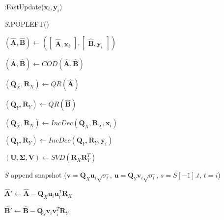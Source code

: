 \begin{algorithm}[t]
    \caption{\oursolution:FastUpdate($\boldsymbol{x}_i,\boldsymbol{y}_i$)}
    \label{alg:fast-update}
    \DontPrintSemicolon
    
    {
        $S$.POPLEFT()
    }
    
    $(\hat{\boldsymbol{A}},\hat{\boldsymbol{B}})\leftarrow (\begin{bmatrix} \hat{\boldsymbol{A}} , \boldsymbol{x}_i \end{bmatrix}, \begin{bmatrix} \hat{\boldsymbol{B}} , \boldsymbol{y}_i \end{bmatrix})$

    {
        $(\hat{\boldsymbol{A}},\hat{\boldsymbol{B}}) \leftarrow COD(\hat{\boldsymbol{A}},\hat{\boldsymbol{B}})$

        $(\boldsymbol{Q}_X,\boldsymbol{R}_X) \leftarrow QR(\hat{\boldsymbol{A}})$
        
        $(\boldsymbol{Q}_Y,\boldsymbol{R}_Y) \leftarrow QR(\hat{\boldsymbol{B}})$
    }
    \Else
    {
        $(\boldsymbol{Q}_X,\boldsymbol{R}_X)\leftarrow IncDec(\boldsymbol{Q}_X,\boldsymbol{R}_X,\boldsymbol{x}_i)$
        
        $(\boldsymbol{Q}_Y,\boldsymbol{R}_Y)\leftarrow IncDec(\boldsymbol{Q}_Y,\boldsymbol{R}_Y,\boldsymbol{y}_i)$
    }

    $(\boldsymbol{U},\boldsymbol{\Sigma},\boldsymbol{V}) \leftarrow SVD(\boldsymbol{R}_X\boldsymbol{R}_Y^T)$
    
    {
        {
            $S$ append snapshot ($\boldsymbol{v}=\boldsymbol{Q}_X\boldsymbol{u}_i\sqrt{\sigma_i}$, $\boldsymbol{u} = \boldsymbol{Q}_Y\boldsymbol{v}_i\sqrt{\sigma_i}$, $s=S[-1].t$, $t=i$)

            $\hat{\boldsymbol{A}}{'}\leftarrow \hat{\boldsymbol{A}} - \boldsymbol{Q}_X\boldsymbol{u}_i\boldsymbol{u}_i^T\boldsymbol{R}_X$

            $\hat{\boldsymbol{B}}{'} \leftarrow \hat{\boldsymbol{B}} - \boldsymbol{Q}_Y\boldsymbol{v}_i\boldsymbol{v}_i^T\boldsymbol{R}_Y$
            
}}
\end{algorithm}
